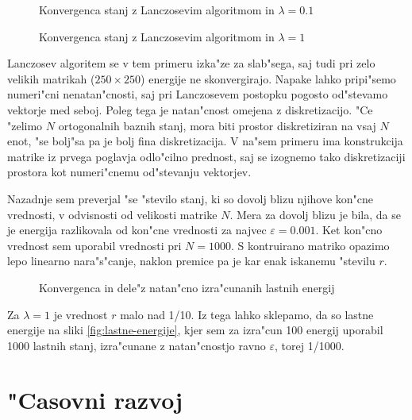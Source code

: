 \documentclass[a4paper,10pt]{article}
\begin{document}
\begin{figure}[H]
\centering

\caption{Konvergenca stanj z Lanczosevim algoritmom in $\lambda=0.1$}
\end{figure}

\begin{figure}[H]
\centering

\caption{Konvergenca stanj z Lanczosevim algoritmom in $\lambda=1$}
\end{figure}

Lanczosev algoritem se v tem primeru izka"ze za slab"sega, saj tudi pri zelo velikih matrikah ($250\times 250$) energije ne skonvergirajo. Napake lahko pripi"semo numeri"cni nenatan"cnosti, saj pri Lanczosevem postopku pogosto od"stevamo vektorje med seboj. Poleg tega je natan"cnost omejena z diskretizacijo. "Ce "zelimo $N$ ortogonalnih baznih stanj, mora biti prostor diskretiziran na vsaj $N$ enot, "se bolj"sa pa je bolj fina diskretizacija. V na"sem primeru ima konstrukcija matrike iz prvega poglavja odlo"cilno prednost, saj se izognemo tako diskretizaciji prostora kot numeri"cnemu od"stevanju vektorjev. 

Nazadnje sem preverjal "se "stevilo stanj, ki so dovolj blizu njihove kon"cne vrednosti, v odvisnosti od velikosti matrike $N$. Mera za dovolj blizu je bila, da se je energija razlikovala od kon"cne vrednosti za najvec $\varepsilon = 0.001$. Ket kon"cno vrednost sem uporabil vrednosti pri $N=1000$. S kontruirano matriko opazimo lepo linearno nara"s"canje, naklon premice pa je kar enak iskanemu "stevilu $r$. 

\begin{figure}
\centering
 
 \caption{Konvergenca in dele"z natan"cno izra"cunanih lastnih energij}
 \label{fig:konvergenca}
\end{figure}


Za $\lambda=1$ je vrednost $r$ malo nad 1/10. Iz tega lahko sklepamo, da so lastne energije na sliki \ref{fig:lastne-energije}, kjer sem za izra"cun 100 energij uporabil 1000 lastnih stanj, izra"cunane z natan"cnostjo ravno $\varepsilon$, torej 1/1000. 

\section{"Casovni razvoj}
\end{document}
